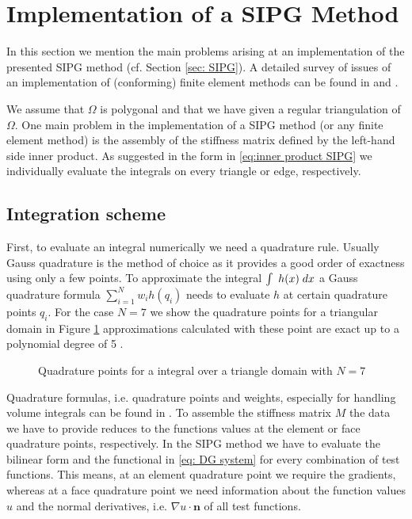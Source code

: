 \section{Implementation of a SIPG Method}

In this section we mention the main problems arising at an implementation of the presented SIPG method (cf. Section \ref{sec: SIPG}). A detailed survey of issues of an implementation of (conforming) finite element methods can be found in \cite[Section 0.6]{BS2002} and \cite[Chapter 8]{Braess2003}. 

We assume that $\Omega$ is polygonal and that we have given a regular triangulation of $\Omega$. One main problem in the implementation of a SIPG method (or any finite element method) is the assembly of the stiffness matrix defined by the left-hand side inner product. As suggested in the form in \eqref{eq:inner product SIPG} we individually evaluate the integrals on every triangle or edge, respectively. %

\subsection{Integration scheme}
First, to evaluate an integral numerically we need a quadrature rule. Usually Gauss quadrature is the method of choice as it provides a good order of exactness using only a few points. To approximate the integral $\int_{\phantom{x}} {{h(x)}\;dx} $ a Gauss quadrature formula $\sum_{i=1}^{N} w_i h(q_i)$ needs to evaluate $h$ at certain quadrature points $q_i$. For the case $N=7$ we show the quadrature points for a triangular domain in Figure \ref{fig: quadrature} approximations calculated with these point are exact up to a polynomial degree of 5 \cite[p.314]{Strout1971}.
\begin{figure}[!h]
	\centering
	
	\caption{Quadrature points for a integral over a triangle domain with $N=7$}
	 \label{fig: quadrature}
\end{figure}
Quadrature formulas, i.e. quadrature points and weights, especially for handling volume integrals can be found in \cite{Strout1971}.
To assemble the stiffness matrix $M$ the data we have to provide reduces to the functions values at the element or face quadrature points, respectively.  
In the SIPG method we have to evaluate the bilinear form and the functional in \eqref{eq: DG system} for every combination of test functions. This means, at an element quadrature point we require the gradients, whereas at a face quadrature point we need information about the function values $u$ and the normal derivatives, i.e. $\nabla u \cdot \mathbf{n}$ of all test functions.

